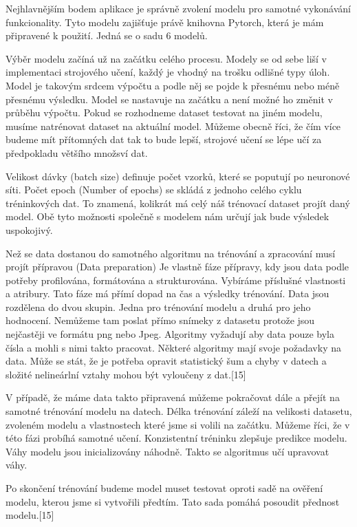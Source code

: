 \documentclass[journal]{IEEEtran}
\begin{document}
Nejhlavnějším bodem aplikace je správně zvolení modelu pro samotné vykonávání funkcionality. Tyto modelu zajišťuje právě knihovna Pytorch, která je mám připravené k použití. Jedná se o sadu 6 modelů.

Výběr modelu začíná už na začátku celého procesu. Modely se od sebe liší v implementaci strojového učení, každý je vhodný na trošku odlišné typy úloh. Model je takovým srdcem výpočtu a podle něj se pojde k přesnému nebo méně přesnému výsledku. Model se nastavuje na začátku a není možné ho změnit v průběhu výpočtu. Pokud se rozhodneme dataset testovat na jiném modelu, musíme natrénovat dataset na aktuální model. Můžeme obecně říci, že čím více budeme mít přítomných dat tak to bude lepší, strojové učení se lépe učí za předpokladu většího množsví dat.

Velikost dávky (batch size) definuje počet vzorků, které se poputují po neuronové síti. Počet epoch (Number of epochs) se skládá z jednoho celého cyklu tréninkových dat. To znamená, kolikrát má celý náš trénovací dataset projít daný model. Obě tyto možnosti společně s modelem nám určují jak bude výsledek uspokojivý.

Než se data dostanou do samotného algoritmu na trénování a  zpracování musí projít přípravou (Data preparation) Je vlastně fáze přípravy, kdy jsou data podle potřeby profilována, formátována a strukturována. Vybíráme příslušné vlastnosti a atribury. Tato fáze má přímí dopad na čas a výsledky trénování. Data jsou rozdělena do dvou skupin. Jedna pro trénování modelu a druhá pro jeho hodnocení. Nemůžeme tam poslat přímo snímeky z datasetu protože jsou nejčastěji ve formátu png nebo Jpeg. Algoritmy vyžadují aby data pouze byla čísla a mohli s nimi takto pracovat. Některé algoritmy mají svoje požadavky na data. Může se stát, že je potřeba opravit statistický šum a chyby v datech a složité nelineárlní vztahy mohou být vyloučeny z dat.[15]

V případě, že máme data takto připravená můžeme pokračovat dále a přejít na samotné trénování modelu na datech. Délka trénování záleží na velikosti datasetu, zvoleném modelu a vlastnostech které jsme si volili na začátku. Můžeme říci, že v této fázi probíhá samotné učení. Konzistentní tréninku zlepšuje predikce modelu. Váhy modelu jsou inicializovány náhodně. Takto se algoritmus učí upravovat váhy.

Po skončení trénování budeme model muset testovat oproti sadě na ověření modelu, kterou jsme si vytvořili předtím. Tato sada pomáhá posoudit přednost modelu.[15] 
\end{document}
